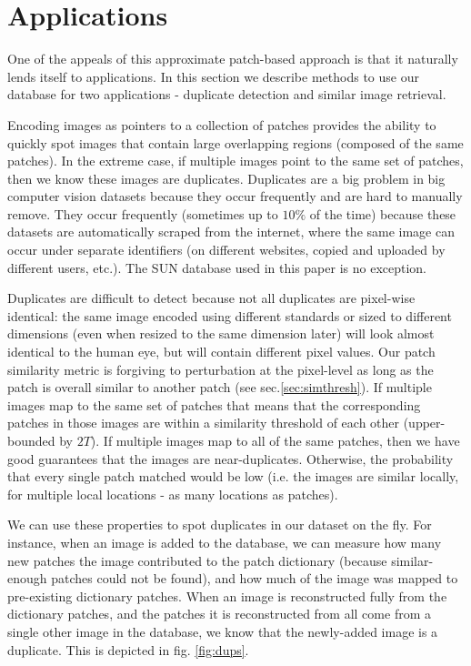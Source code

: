 \section{Applications}\label{sec:apps}

One of the appeals of this approximate patch-based approach
is that it naturally lends itself to applications. In this
section we describe methods to use our database for
two applications - duplicate detection and similar image retrieval.


Encoding images as pointers to a collection of patches provides the ability to quickly spot images that contain large overlapping regions (composed of the same patches). In the extreme case, if multiple images point to the same set of patches, then we know these images are duplicates. Duplicates are a big problem in big computer vision datasets because they occur frequently and are hard to manually remove. They occur frequently (sometimes up to $10\%$ of the time) because these datasets are automatically scraped from the internet, where the same image can occur under separate identifiers (on different websites, copied and uploaded by different users, etc.). The SUN database \cite{SUN} used in this paper is no exception.

Duplicates are difficult to detect because not all duplicates are pixel-wise identical: the same image encoded using different standards or sized to different dimensions (even when resized to the same dimension later) will look almost identical to the human eye, but will contain different pixel values. Our patch similarity metric is forgiving to perturbation at the pixel-level as long as the patch is overall similar to another patch (see sec.\ref{sec:simthresh}). If multiple images map to the same set of patches that means that the corresponding patches in those images are within a similarity threshold of each other (upper-bounded by $2T$). If multiple images map to all of the same patches, then we have good guarantees that the images are near-duplicates. Otherwise, the probability that every single patch matched would be low (i.e. the images are similar locally, for multiple local locations - as many locations as patches). 

We can use these properties to spot duplicates in our dataset on the fly. For instance, when an image is added to the database, we can measure how many new patches the image contributed to the patch dictionary (because similar-enough patches could not be found), and how much of the image was mapped to pre-existing dictionary patches. When an image is reconstructed fully from the dictionary patches, and the patches it is reconstructed from all come from a single other image in the database, we know that the newly-added image is a duplicate. This is depicted in fig. \ref{fig:dups}. 


